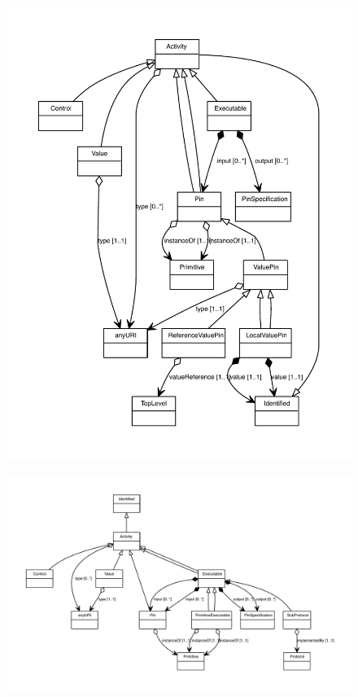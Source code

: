 \begin{figure}[ht]
\begin{center}
\includegraphics[scale=0.8]{uml/LocalValuePin_abstraction_hierarchy.pdf}
\end{center}
\end{figure}

\begin{figure}[ht]
\begin{center}
\includegraphics[scale=0.8]{uml/PrimitiveExecutable_abstraction_hierarchy.pdf}
\end{center}
\end{figure}

